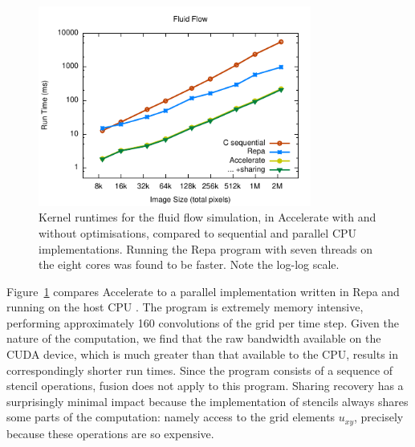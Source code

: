 \begin{figure}
    \begin{center}
        \includegraphics[width=0.8\textwidth]{images/results/fluid/fluid}
    \end{center}
    \caption[Fluid flow simulation kernel benchmarks]{Kernel runtimes for the
        fluid flow simulation, in Accelerate with and without optimisations,
        compared to sequential and parallel CPU implementations. Running the
        Repa program with seven threads on the eight cores was found to be
        faster. Note the log-log scale.}
    \label{fig:fluid}
\end{figure}

Figure~\ref{fig:fluid} compares Accelerate to a parallel implementation written
in Repa and running on the host CPU \cite{Lippmeier:2012gx}. The program is
extremely memory intensive, performing approximately 160 convolutions of the
grid per time step. Given the nature of the computation, we find that the raw
bandwidth available on the CUDA device, which is much greater than that
available to the CPU, results in correspondingly shorter run times. Since the
program consists of a sequence of stencil operations, fusion does not apply to
this program. Sharing recovery has a surprisingly minimal impact because the
implementation of stencils always shares some parts of the computation: namely
access to the grid elements $u_{xy}$, precisely because these operations are so
expensive.


%


